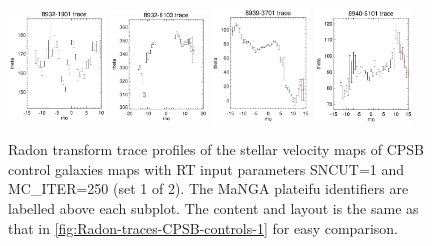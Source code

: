 \documentclass[fleqn,usenatbib]{mnras}
\begin{document}
\begin{figure}
    \includegraphics[width=0.23\textwidth]{Images/SN1-MC250/CPSB-CTRLs/8932-1901-1-250.png}
    \includegraphics[width=0.23\textwidth]{Images/SN1-MC250/CPSB-CTRLs/8932-6103-1-250.png}
    \includegraphics[width=0.23\textwidth]{Images/SN1-MC250/CPSB-CTRLs/8939-3701-1-250.png}
    \includegraphics[width=0.23\textwidth]{Images/SN1-MC250/CPSB-CTRLs/8940-6101-1-250.png}
    \caption{Radon transform trace profiles of the stellar velocity maps of CPSB control galaxies maps with RT input parameters SNCUT=1 and MC\_ITER=250 (set 1 of 2). The MaNGA plateifu identifiers are labelled above each subplot. The content and layout is the same as that in \ref{fig:Radon-traces-CPSB-controls-1} for easy comparison.}
    \label{fig:Radon-traces-CPSB-controls-1-SN1-MC250}
\end{figure}
\end{document}
